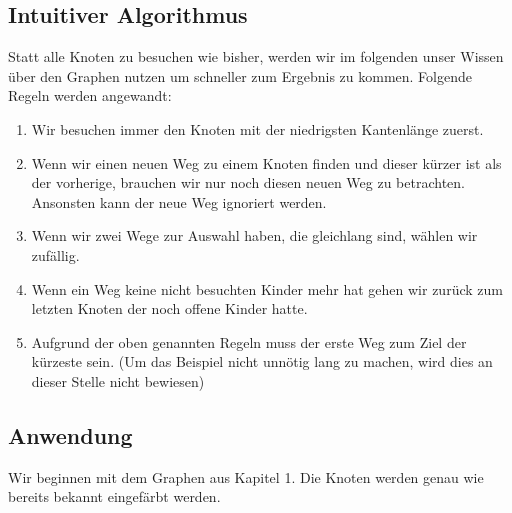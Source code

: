 \subsection{Intuitiver Algorithmus}
Statt alle Knoten zu besuchen wie bisher, werden wir im folgenden unser Wissen \"uber den Graphen nutzen um schneller zum Ergebnis zu kommen. Folgende Regeln werden angewandt:
\begin{enumerate}
	\item Wir besuchen immer den Knoten mit der niedrigsten Kantenl\"ange zuerst.
	\item Wenn wir einen neuen Weg zu einem Knoten finden und dieser k\"urzer ist als der vorherige, brauchen wir nur noch diesen neuen Weg zu betrachten. Ansonsten kann der neue Weg ignoriert werden.
	\item Wenn wir zwei Wege zur Auswahl haben, die gleichlang sind, w\"ahlen wir zuf\"allig.
	\item Wenn ein Weg keine nicht besuchten Kinder mehr hat gehen wir zur\"uck zum letzten Knoten der noch offene Kinder hatte.
	\item Aufgrund der oben genannten Regeln muss der erste Weg zum Ziel der k\"urzeste sein. (Um das Beispiel nicht unn\"otig lang zu machen, wird dies an dieser Stelle nicht bewiesen)
\end{enumerate}

\subsection{Anwendung}
Wir beginnen mit dem Graphen aus Kapitel 1. Die Knoten werden genau wie bereits bekannt eingef\"arbt werden. 

